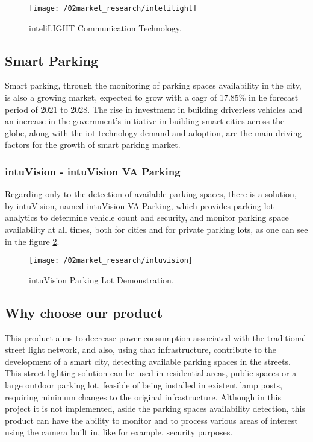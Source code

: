 \begin{figure}[ht]
	\centering
	\texttt{[image: /02market\_research/intelilight]}
	\caption{inteliLIGHT Communication Technology.}
	\label{fig:intelilight}
\end{figure}

\subsection{Smart Parking}
Smart parking, through the monitoring of parking spaces availability in the city, is also a growing market, expected to grow with a \ac{cagr} of 17.85\% in he forecast period of 2021 to 2028.\cite{smart_parking_market} The rise in investment in building driverless vehicles and an increase in the government’s initiative in building smart cities across the globe, along with the \ac{iot} technology demand and adoption, are the main driving factors for the growth of smart parking market.

\subsubsection{intuVision - intuVision VA Parking}
Regarding only to the detection of available parking spaces, there is a solution, by intuVision, named intuVision VA Parking, which provides parking lot analytics to determine vehicle count and security, and monitor parking space availability at all times, both for cities and for private parking lots, as one can see in the figure \ref{fig:intuvision}.\cite{parking}

\begin{figure}[ht]
	\centering
	\texttt{[image: /02market\_research/intuvision]}
	\caption{intuVision Parking Lot Demonstration.}
	\label{fig:intuvision}
\end{figure}

\subsection{Why choose our product}
This product aims to decrease power consumption associated with the traditional street light network, and also, using that infrastructure, contribute to the development of a smart city, detecting available parking spaces in the streets. This street lighting solution can be used in residential areas, public spaces or a large outdoor parking lot, feasible of being installed in existent lamp posts, requiring minimum changes to the original infrastructure. Although in this project it is not implemented, aside the parking spaces availability detection, this product can have the ability to monitor and to process various areas of interest using the camera built in, like for example, security purposes.
